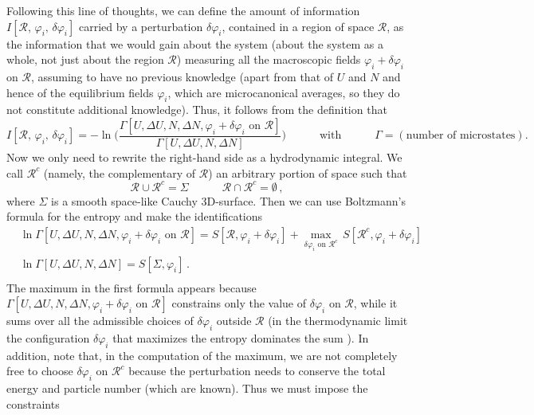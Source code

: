 \documentclass[aps,prl,reprint,nofootinbib]{revtex4-1}
\newcommand{\spc}{\quad \quad \quad}
\begin{document}
Following this line of thoughts, we can define the amount of information $I[\mathcal{R},\, \varphi_i, \, \delta \varphi_i]$ carried by a perturbation $\delta \varphi_i$, contained in a region of space $\mathcal{R}$, as the information that we would gain about the system (about the system as a whole, not just about the region $\mathcal{R}$) measuring all the macroscopic fields $\varphi_i + \delta \varphi_i$ on $\mathcal{R}$, assuming to have no previous knowledge (apart from that of $U$ and $N$ and hence of the equilibrium fields $\varphi_i$, which are microcanonical averages, so they do not constitute additional knowledge). Thus, it follows from the definition that
\begin{equation}\label{Iuuz}
I[\mathcal{R},\, \varphi_i, \, \delta \varphi_i] = -\ln \bigg( \dfrac{\Gamma[U,\Delta U,N,\Delta N, \varphi_i +\delta \varphi_i \text{ on } \mathcal{R}]}{\Gamma[U,\Delta U,N,\Delta N]}  \bigg) \spc \text{with} \spc \Gamma=(\text{number of microstates}) .
\end{equation} 
Now we only need to rewrite the right-hand side as a hydrodynamic integral. We call $\mathcal{R}^c$ (namely, the complementary of $\mathcal{R}$) an arbitrary portion of space such that 
\begin{equation}
\mathcal{R} \cup \mathcal{R}^c = \Sigma  \spc \mathcal{R} \cap \mathcal{R}^c =  \emptyset \, ,
\end{equation}
where $\Sigma$ is a smooth space-like Cauchy 3D-surface. Then we can use Boltzmann's formula for the entropy and make the identifications
\begin{equation}\label{Micruz}
\begin{split}
& \ln \Gamma[U,\Delta U,N,\Delta N, \varphi_i +\delta \varphi_i \text{ on } \mathcal{R}] = S[\mathcal{R}, \varphi_i + \delta \varphi_i] + \max_{\delta \varphi_i \text{ on }\mathcal{R}^c} \, S[\mathcal{R}^c, \varphi_i + \delta \varphi_i] \\ 
& \ln\Gamma[U,\Delta U,N,\Delta N] = S[\Sigma, \varphi_i] \, . \\
\end{split}
\end{equation}
The maximum in the first formula appears because $\Gamma[U,\Delta U,N,\Delta N, \varphi_i +\delta \varphi_i \text{ on } \mathcal{R}]$ constrains only the value of $\delta \varphi_i$ on $\mathcal{R}$, while it sums over all the admissible choices of $\delta \varphi_i$ outside $\mathcal{R}$ (in the thermodynamic limit the configuration $\delta \varphi_i$ that maximizes the entropy dominates the sum \cite{huang_book}). In addition, note that, in the computation of the maximum, we are not completely free to choose $\delta \varphi_i$ on $\mathcal{R}^c$ because the perturbation needs to conserve the total energy and particle number (which are known). Thus we must impose the constraints
\end{document}
